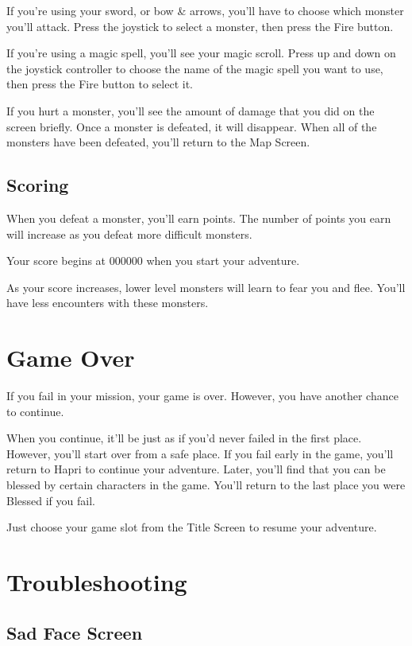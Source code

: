 \documentclass[10pt,twoside,openright]{memoir}
\begin{document}
If you're using your sword, or bow \& arrows, you'll have to choose
which monster you'll attack. Press the joystick to select a monster,
then press the Fire button.

If you're using a magic spell, you'll see your magic scroll. Press up
and down on the joystick controller to choose the name of the magic
spell you want to use, then press the Fire button to select it.

If you hurt a monster, you'll see the amount of damage that you did on
the   screen  briefly.   Once   a  monster   is   defeated,  it   will
disappear. When all of the  monsters have been defeated, you'll return
to the Map Screen.

\section{Scoring}

When you  defeat a monster, you'll  earn points. The number  of points
you earn will increase as you defeat more difficult monsters.

Your score begins at 000000 when you start your adventure.

As your score  increases, lower level monsters will learn  to fear you
and flee. You'll have less encounters with these monsters.

\chapter{Game Over}

If you fail in your mission, your game is over. However, you have
another chance to continue.

When you continue, it'll be just as if you'd never failed in the first
place. However, you'll start over from a safe place. If you fail early
in the game, you'll return to Hapri to continue your adventure. Later,
you'll find that you can be blessed by certain characters in the
game. You'll return to the last place you were Blessed if you fail.

Just choose your game slot from the Title Screen to resume your
adventure.

\chapter{Troubleshooting}

\section{Sad Face Screen}
\end{document}
